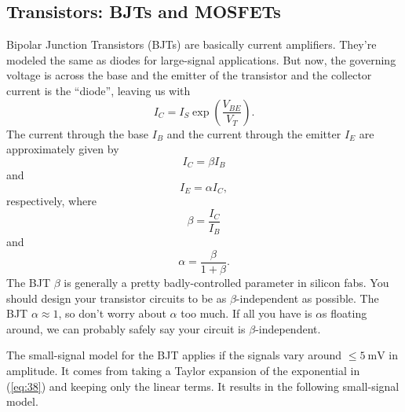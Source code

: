 \documentclass[12pt]{report}
\begin{document}
\subsection{Transistors: BJTs and MOSFETs}
Bipolar Junction Transistors (BJTs) are basically current amplifiers. They're modeled the same as diodes for large-signal applications. But now, the governing voltage is across the base and the emitter of the transistor and the collector current is the ``diode'', leaving us with
\begin{equation}
\label{eq:38}
I_{C} = I_{S} \exp \left( \frac{V_{BE}}{V_{T}} \right).
\end{equation}
The current through the base $I_{B}$ and the current through the emitter $I_{E}$ are approximately given by
\begin{equation}
  \label{eq:39}
  I_{C} = \beta I_{B}
\end{equation}
and
\begin{equation}
  \label{eq:40}
  I_{E} = \alpha I_{C},
\end{equation}
respectively, where
\begin{equation}
\label{eq:41}
\beta = \frac{I_{C}}{I_{B}}
\end{equation}
and
\begin{equation}
\label{eq:42}
\alpha = \frac{ \beta }{ 1 + \beta }.
\end{equation}
The BJT $\beta$ is generally a pretty badly-controlled parameter in silicon fabs. You should design your transistor circuits to be as $\beta$-independent as possible. The BJT $\alpha \approx 1$, so don't worry about $\alpha$ too much. If all you have is $\alpha$s floating around, we can probably safely say your circuit is $\beta$-independent.

The small-signal model for the BJT applies if the signals vary around $\leq \SI{5}{\mV}$ in amplitude. It comes from taking a Taylor expansion of the exponential in (\ref{eq:38}) and keeping only the linear terms. It results in the following small-signal model. 
\end{document}
